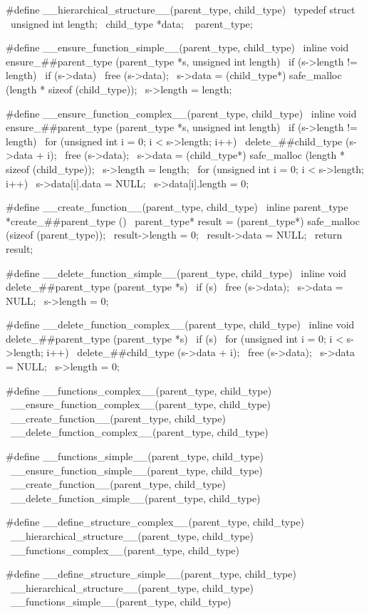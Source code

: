 \documentclass{article}
\begin{document}
\begin{ccode}
#define __hierarchical_structure__(parent_type, child_type) \
typedef struct { \
  unsigned int length; \
  child_type *data; \
} parent_type;

#define __ensure_function_simple__(parent_type, child_type) \
inline void ensure_##parent_type (parent_type *s, unsigned int length) { \
  if (s->length != length) { \
   if (s->data) \
      free (s->data); \
   s->data = (child_type*) safe_malloc (length * sizeof (child_type)); \
   s->length = length; \
  } \
}

#define __ensure_function_complex__(parent_type, child_type) \
inline void ensure_##parent_type (parent_type *s, unsigned int length) { \
  if (s->length != length) { \
   for (unsigned int i = 0; i < s->length; i++) \
      delete_##child_type (s->data + i); \
   free (s->data); \
   s->data = (child_type*) safe_malloc (length * sizeof (child_type)); \
   s->length = length; \
   for (unsigned int i = 0; i < s->length; i++) { \
      s->data[i].data = NULL; \
      s->data[i].length = 0; \
   } \
  } \
}

#define __create_function__(parent_type, child_type) \
inline parent_type *create_##parent_type () { \
  parent_type* result = (parent_type*) safe_malloc (sizeof (parent_type)); \
  result->length = 0; \
  result->data = NULL; \
  return result; \
}

#define __delete_function_simple__(parent_type, child_type) \
inline void delete_##parent_type (parent_type *s) { \
  if (s) { \
   free (s->data); \
   s->data = NULL; \
   s->length = 0; \
  } \
}

#define __delete_function_complex__(parent_type, child_type) \
inline void delete_##parent_type (parent_type *s) { \
  if (s) { \
   for (unsigned int i = 0; i < s->length; i++) \
      delete_##child_type (s->data + i); \
   free (s->data); \
   s->data = NULL; \
   s->length = 0; \
  } \
}

#define __functions_complex__(parent_type, child_type) \
__ensure_function_complex__(parent_type, child_type) \
__create_function__(parent_type, child_type) \
__delete_function_complex__(parent_type, child_type)

#define __functions_simple__(parent_type, child_type) \
__ensure_function_simple__(parent_type, child_type) \
__create_function__(parent_type, child_type) \
__delete_function_simple__(parent_type, child_type)

#define __define_structure_complex__(parent_type, child_type) \
__hierarchical_structure__(parent_type, child_type) \
__functions_complex__(parent_type, child_type)

#define __define_structure_simple__(parent_type, child_type) \
__hierarchical_structure__(parent_type, child_type) \
__functions_simple__(parent_type, child_type)
\end{ccode}
\end{document}
